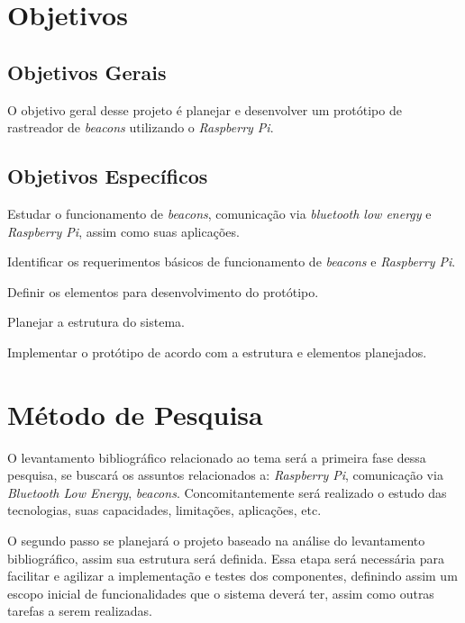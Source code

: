 \documentclass[
	12pt,				%
	openright,			%
	oneside,			%
	a4paper,			%
	chapter=TITLE,		%
	english,			%
	french,				%
	spanish,			%
	brazil				%
	]{abntex2}
\begin{document}
{%

\chapter{Objetivos}


\section{Objetivos Gerais}

O objetivo geral desse projeto é planejar e desenvolver um protótipo de rastreador de \textit{beacons} utilizando o \textit{Raspberry Pi}.


\section{Objetivos Específicos}

\begin{alineas}
	\item Estudar o funcionamento de \textit{beacons}, comunicação via \textit{bluetooth low energy} e \textit{Raspberry Pi}, assim como suas aplicações.
	\item Identificar os requerimentos básicos de funcionamento de \textit{beacons} e \textit{Raspberry Pi}.
	\item Definir os elementos para desenvolvimento do protótipo.
	\item Planejar a estrutura do sistema.
	\item Implementar o protótipo de acordo com a estrutura e elementos planejados.
\end{alineas}


\chapter{Método de Pesquisa}

O levantamento bibliográfico relacionado ao tema será a primeira fase dessa pesquisa, se buscará os assuntos relacionados a: \textit{Raspberry Pi}, comunicação via \textit{Bluetooth Low Energy}, \textit{beacons}. Concomitantemente será realizado o estudo das tecnologias, suas capacidades, limitações, aplicações, etc.

O segundo passo se planejará o projeto baseado na análise do levantamento bibliográfico, assim sua estrutura será definida. Essa etapa será necessária para facilitar e agilizar a implementação e testes dos componentes, definindo assim um escopo inicial de funcionalidades que o sistema deverá ter, assim como outras tarefas a serem realizadas.

}
\end{document}
